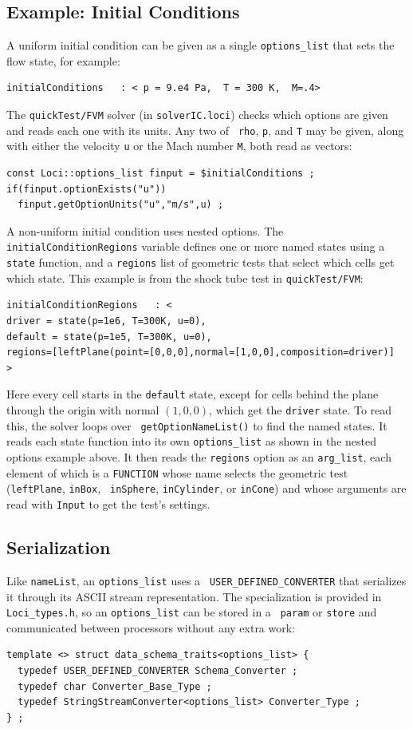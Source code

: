 \subsection {Example: Initial Conditions}
%
A uniform initial condition can be given as a single {\tt options\_list}
that sets the flow state, for example:
\begin{verbatim}
initialConditions   : < p = 9.e4 Pa,  T = 300 K,  M=.4>
\end{verbatim}
The {\tt quickTest/FVM} solver (in {\tt solverIC.loci}) checks which
options are given and reads each one with its units.  Any two of {\tt
  rho}, {\tt p}, and {\tt T} may be given, along with either the
velocity {\tt u} or the Mach number {\tt M}, both read as vectors:
\begin{verbatim}
const Loci::options_list finput = $initialConditions ;
if(finput.optionExists("u"))
  finput.getOptionUnits("u","m/s",u) ;
\end{verbatim}
%
A non-uniform initial condition uses nested options.  The {\tt
  initialConditionRegions} variable defines one or more named states
using a {\tt state} function, and a {\tt regions} list of geometric
tests that select which cells get which state.  This example is from
the shock tube test in {\tt quickTest/FVM}:
\begin{verbatim}
initialConditionRegions   : <
driver = state(p=1e6, T=300K, u=0),
default = state(p=1e5, T=300K, u=0),
regions=[leftPlane(point=[0,0,0],normal=[1,0,0],composition=driver)]
>
\end{verbatim}
Here every cell starts in the {\tt default} state, except for cells
behind the plane through the origin with normal $(1,0,0)$, which get the
{\tt driver} state.  To read this, the solver loops over {\tt
  getOptionNameList()} to find the named states.  It reads each state
function into its own {\tt options\_list} as shown in the nested
options example above.  It then reads the {\tt regions} option as an
{\tt arg\_list}, each element of which is a {\tt FUNCTION} whose name
selects the geometric test ({\tt leftPlane}, {\tt inBox}, {\tt
  inSphere}, {\tt inCylinder}, or {\tt inCone}) and whose arguments
are read with {\tt Input} to get the test's settings.
%
\subsection {Serialization}
%
Like {\tt nameList}, an {\tt options\_list} uses a {\tt
  USER\_DEFINED\_CONVERTER} that serializes it through its ASCII
stream representation.  The specialization is provided in {\tt
  Loci\_types.h}, so an {\tt options\_list} can be stored in a {\tt
  param} or {\tt store} and communicated between processors without any
extra work:
\begin{verbatim}
template <> struct data_schema_traits<options_list> {
  typedef USER_DEFINED_CONVERTER Schema_Converter ;
  typedef char Converter_Base_Type ;
  typedef StringStreamConverter<options_list> Converter_Type ;
} ;
\end{verbatim}
